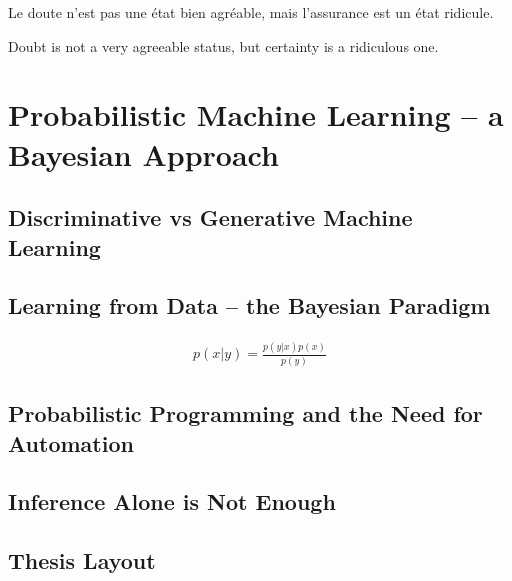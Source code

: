 
\begin{savequote}[8cm]
	\textlatin{Le doute n'est pas une état bien agréable, mais l'assurance est un état ridicule.}
	
	Doubt is not a very agreeable status, but certainty is a ridiculous one.
\end{savequote}

\chapter{Probabilistic Machine Learning -- a Bayesian Approach}
\label{chp:intro}




\section{Discriminative vs Generative Machine Learning}
\label{sec:intro:discrim}



\section{Learning from Data -- the Bayesian Paradigm}

\begin{align}
	\label{eq:bayes}
	p(x|y) = \frac{p(y|x)p(x)}{p(y)}
\end{align}

\section{Probabilistic Programming and the Need for Automation}

\section{Inference Alone is Not Enough}

\section{Thesis Layout}